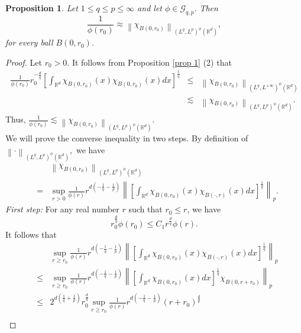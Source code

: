 \documentclass[a4paper,12pt,intlimits,oneside]{amsart}
\numberwithin{equation}{section}
\newtheorem{proposition}[theorem]{Proposition}
\numberwithin{equation}{section}
\theoremstyle{definition}
\begin{document}
\begin{proposition}
 Let $1\leq q \leq  p \leq \infty$ and let $ \phi \in \mathcal{G}_{q,p}. $ Then 
 $$\frac{1}{\phi(r_{0})} \approx \left\| \chi_{B(0,r_{0})} \right\|_{(L^{q},L^{p})^{\phi }(\mathbb{R}^{d})}, $$ for every ball $ B(0,r_{0}). $
 \end{proposition}
\begin{proof}
Let $ r_{0} >0. $ It follows from Proposition \ref{prop 1} (2) that 
\begin{eqnarray*}
 \frac{1}{\phi(r_{0})} r_{0}^{-\frac{d}{q}} \left[\int_{\mathbb R^{d}} \chi_{B(0,r_{0})}(x)\chi_{B(0,r_{0})}(x)dx\right]^{\frac{1}{q}} &\leq &         \left\|\chi_{B(0,r_{0})} \right\|_{(L^{q},L^{+\infty})^{\phi}(\mathbb{R}^{d})}\\
 & \lesssim & \left\|\chi_{B(0,r_{0})}\right\|_{(L^{q},L^{p})^{\phi}(\mathbb{R}^{d})}.
\end{eqnarray*}
Thus, $ \frac{1}{\phi(r_{0})} \lesssim \left\| \chi_{B(0,r_{0})} \right\|_{(L^{q},L^{p})^{\phi }(\mathbb{R}^{d})}. $\\
We will prove the converse inequality in two steps. By definition of $\left\| \cdot \right\|_{(L^{q},L^{p})^{\phi }(\mathbb{R}^{d})},$ we have 
\begin{eqnarray*}
&&\left\| \chi_{B(0,r_{0})} \right\|_{(L^{q},L^{p})^{\phi }(\mathbb{R}^{d})} \\&=& \sup_{r>0} \frac{1}{\phi(r)} r^{d(-\frac{1}{q}-\frac{1}{p})} \left\|\left[\int_{\mathbb R^{d}} \chi_{B(0,r_{0})}(x)\chi_{B(\cdot,r)}(x)dx\right]^{\frac{1}{q}}\right\|_p. 
\end{eqnarray*}
\textit{First step:} For any real number $r$ such that $ r_{0} \leq r  $, we have
\begin{equation} \label{eqq 1}
r_{0}^{\frac{d}{q}}\phi(r_{0}) \leq C_{1} r^{\frac{d}{q}}\phi(r).
\end{equation}
It follows that
\begin{eqnarray*}
&&\sup_{r \ge r_{0}} \frac{1}{\phi(r)} r^{d(-\frac{1}{q}-\frac{1}{p})} \left\|\left[\int_{\mathbb R^{d}}  \chi_{B(0,r_{0})}(x)\chi_{B(\cdot,r)}(x)dx\right]^{\frac{1}{q}}\right\|_p \\&\leq& \sup_{r \ge r_{0}} \frac{1}{\phi(r)} r^{d(-\frac{1}{q}-\frac{1}{p})} \left\|\left[\int_{\mathbb R^{d}}  \chi_{B(0,r_{0})}(x)dx\right]^{\frac{1}{q}}\chi_{B(0,r+r_{0})}\right\|_p \\&\leq& 
 2^{d(\frac{1}{q}+\frac{1}{p})}
r^{\frac{d}{q}}_{0}\sup_{r \ge r_{0}} \frac{1}{\phi(r)} r^{d(-\frac{1}{q}-\frac{1}{p})} (r+r_{0})^{\frac{d}{p}}\\

\end{eqnarray*}
\end{proof}
\end{document}

